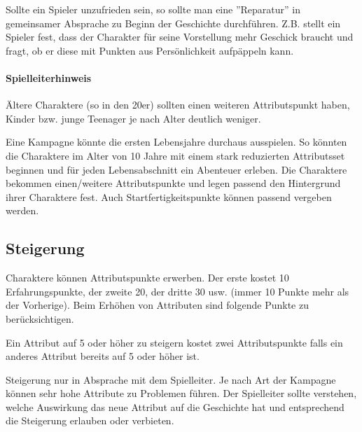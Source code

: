 \documentclass{article}
\begin{document}
Sollte ein Spieler unzufrieden sein, so sollte man eine ''Reparatur'' in gemeinsamer Absprache zu Beginn der Geschichte
durchführen. Z.B. stellt ein Spieler fest, dass der Charakter für seine Vorstellung mehr Geschick braucht und fragt, ob
er diese mit Punkten aus Persönlichkeit aufpäppeln kann.

\begin{mdframed}[hidealllines=true, backgroundcolor=black!10]
\paragraph{Spielleiterhinweis}

Ältere Charaktere (so in den 20er) sollten einen weiteren Attributspunkt haben, Kinder bzw. junge Teenager je nach
Alter deutlich weniger.

Eine Kampagne könnte die ersten Lebensjahre durchaus ausspielen. So könnten die Charaktere im Alter von 10 Jahre
mit einem stark reduzierten Attributsset beginnen und für jeden Lebensabschnitt ein Abenteuer erleben. Die Charaktere
bekommen einen/weitere Attributspunkte und legen passend den Hintergrund ihrer Charaktere fest.
Auch Startfertigkeitspunkte können passend vergeben werden.

\end{mdframed}
\begin{center}
\subsection{Steigerung}
\end{center}

Charaktere können Attributspunkte erwerben. Der erste kostet 10 Erfahrungspunkte, der zweite 20, der dritte 30 usw.
(immer 10 Punkte mehr als der Vorherige). Beim Erhöhen von Attributen sind folgende Punkte zu berücksichtigen.

Ein Attribut auf 5 oder höher zu steigern kostet zwei Attributspunkte falls ein anderes Attribut bereits auf 5
oder höher ist.

Steigerung nur in Absprache mit dem Spielleiter. Je nach Art der Kampagne können sehr hohe Attribute zu Problemen
führen. Der Spielleiter sollte verstehen, welche Auswirkung das neue Attribut auf die Geschichte hat und entsprechend
die Steigerung erlauben oder verbieten.
\end{document}
